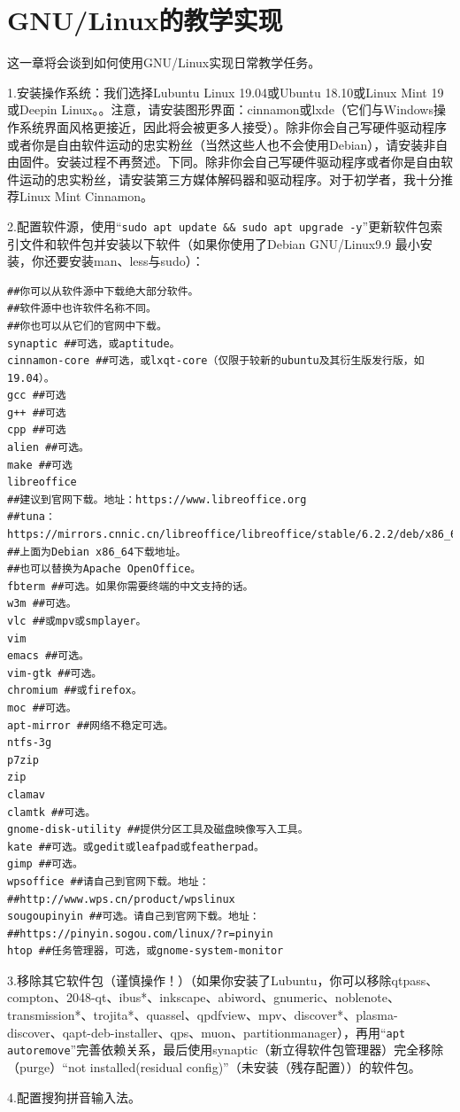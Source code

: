\section{GNU/Linux的教学实现}
这一章将会谈到如何使用GNU/Linux实现日常教学任务。\par
1.安装操作系统：我们选择Lubuntu Linux 19.04或Ubuntu 18.10或Linux Mint 19 或Deepin Linux。。注意，请安装图形界面：cinnamon或lxde（它们与Windows操作系统界面风格更接近，因此将会被更多人接受）。除非你会自己写硬件驱动程序或者你是自由软件运动的忠实粉丝（当然这些人也不会使用Debian），请安装非自由固件。安装过程不再赘述。下同。除非你会自己写硬件驱动程序或者你是自由软件运动的忠实粉丝，请安装第三方媒体解码器和驱动程序。对于初学者，我十分推荐Linux Mint Cinnamon。\par
2.配置软件源，使用“\verb|sudo apt update && sudo apt upgrade -y|”更新软件包索引文件和软件包并安装以下软件（如果你使用了Debian GNU/Linux9.9 最小安装，你还要安装man、less与sudo）：
\begin{verbatim}
##你可以从软件源中下载绝大部分软件。
##软件源中也许软件名称不同。
##你也可以从它们的官网中下载。
synaptic ##可选，或aptitude。
cinnamon-core ##可选，或lxqt-core（仅限于较新的ubuntu及其衍生版发行版，如19.04）。
gcc ##可选
g++ ##可选
cpp ##可选
alien ##可选。
make ##可选
libreoffice
##建议到官网下载。地址：https://www.libreoffice.org
##tuna：https://mirrors.cnnic.cn/libreoffice/libreoffice/stable/6.2.2/deb/x86_64/
##上面为Debian x86_64下载地址。
##也可以替换为Apache OpenOffice。
fbterm ##可选。如果你需要终端的中文支持的话。
w3m ##可选。
vlc ##或mpv或smplayer。
vim
emacs ##可选。
vim-gtk ##可选。
chromium ##或firefox。
moc ##可选。
apt-mirror ##网络不稳定可选。
ntfs-3g
p7zip
zip
clamav
clamtk ##可选。
gnome-disk-utility ##提供分区工具及磁盘映像写入工具。
kate ##可选。或gedit或leafpad或featherpad。
gimp ##可选。
wpsoffice ##请自己到官网下载。地址：
##http://www.wps.cn/product/wpslinux
sougoupinyin ##可选。请自己到官网下载。地址：
##https://pinyin.sogou.com/linux/?r=pinyin
htop ##任务管理器，可选，或gnome-system-monitor
\end{verbatim} \par
3.移除其它软件包（谨慎操作！）（如果你安装了Lubuntu，你可以移除qtpass、compton、2048-qt、ibus*、inkscape、abiword、gnumeric、noblenote、transmission*、trojita*、quassel、qpdfview、mpv、discover*、plasma-discover、qapt-deb-installer、qps、muon、partitionmanager），再用“\verb|apt autoremove|”完善依赖关系，最后使用synaptic（新立得软件包管理器）完全移除（purge）“not installed(residual config)”（未安装（残存配置））的软件包。\par
4.配置搜狗拼音输入法。

